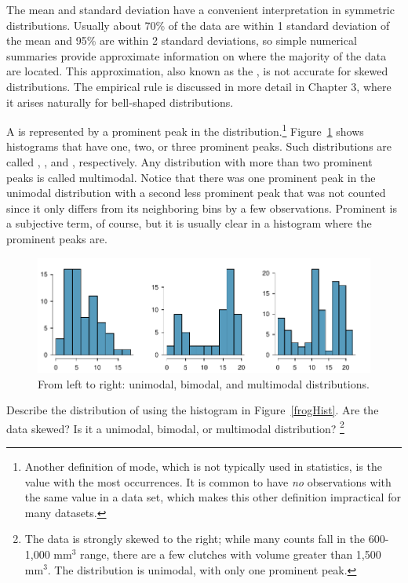 \begin{doublespace}
The mean and standard deviation have a convenient interpretation in symmetric distributions.  Usually about 70\% of the data are within 1 standard deviation of the mean and 95\% are within 2 standard deviations, so simple numerical summaries provide approximate information on where the majority of the data are located.  This approximation, also known as the , is not accurate for skewed distributions.  The empirical rule is discussed in more detail in Chapter 3, where it arises naturally for bell-shaped distributions.

A  is represented by a prominent peak in the distribution.\footnote{Another definition of mode, which is not typically used in statistics, is the value with the most occurrences. It is common to have \emph{no} observations with the same value in a data set, which makes this other definition impractical for many datasets.} Figure~\ref{singleBiMultiModalPlots} shows histograms that have one, two, or three prominent peaks. Such distributions are called , , and , respectively. Any distribution with more than two prominent peaks is called multimodal. Notice that there was one prominent peak in the unimodal distribution with a second less prominent peak that was not counted since it only differs from its neighboring bins by a few observations. Prominent is a subjective term, of course, but it is usually clear in a histogram where the prominent peaks are.  


\begin{figure}[h]
	\centering
	\includegraphics[width=\textwidth]{ch_intro_to_data_oi_biostat/figures/singleBiMultiModalPlots/singleBiMultiModalPlots}
	\caption{From left to right: unimodal, bimodal, and multimodal distributions.}
	\label{singleBiMultiModalPlots}
\end{figure}

\begin{exercise}
	Describe the distribution of  using the histogram in Figure~\ref{frogHist}. Are the data skewed? Is it a unimodal, bimodal, or multimodal distribution? \footnote{The data is strongly skewed to the right; while many counts fall in the 600-1,000 $\textrm {mm}^{3}$ range, there are a few clutches with volume greater than 1,500 $\textrm {mm}^{3}$. The distribution is unimodal, with only one prominent peak.}
\end{exercise}



\end{doublespace}
